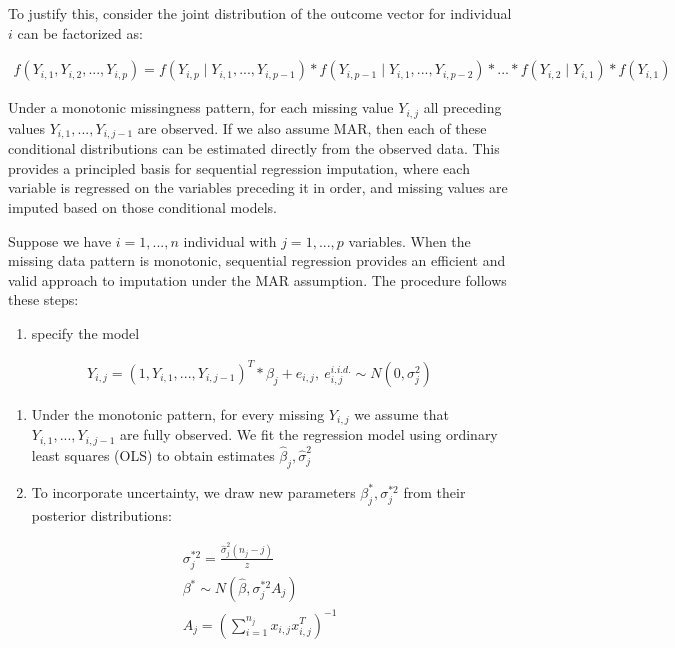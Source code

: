 \documentclass{article}
\providecommand{\tightlist}{%
  \setlength{\itemsep}{0pt}\setlength{\parskip}{0pt}}
\begin{document}
To justify this, consider the joint distribution of the outcome vector
for individual \(i\) can be factorized as:

\begin{align*}
    f(Y_{i,1},Y_{i,2},...,Y_{i,p}) = f(Y_{i,p} \mid Y_{i,1},...,Y_{i,p-1}) * 
    f(Y_{i,p-1} \mid Y_{i,1},...,Y_{i,p-2}) * ... * f(Y_{i,2} \mid Y_{i,1}) 
    * f(Y_{i,1})
    \end{align*}

Under a monotonic missingness pattern, for each missing value
\(Y_{i,j}\) all preceding values \(Y_{i,1},...,Y_{i,j-1}\) are observed.
If we also assume MAR, then each of these conditional distributions can
be estimated directly from the observed data. This provides a principled
basis for sequential regression imputation, where each variable is
regressed on the variables preceding it in order, and missing values are
imputed based on those conditional models.

Suppose we have \(i=1,...,n\) individual with \(j=1,...,p\) variables.
When the missing data pattern is monotonic, sequential regression
provides an efficient and valid approach to imputation under the MAR
assumption. The procedure follows these steps:

\begin{enumerate}
\def\labelenumi{\arabic{enumi}.}
\tightlist
\item
  specify the model
\end{enumerate}

\begin{align*}    
    Y_{i,j} = (1,Y_{i,1},...,Y_{i,j-1})^{T} * \beta_{j} + 
    e_{i,j},\ {e_{i,j}^{i.i.d.} \sim{N} (0,\sigma^{2}_{j})}
    \end{align*}

\begin{enumerate}
\def\labelenumi{\arabic{enumi}.}
\setcounter{enumi}{1}
\item
  Under the monotonic pattern, for every missing \(Y_{i,j}\) we assume
  that \(Y_{i,1},...,Y_{i,j-1}\) are fully observed. We fit the
  regression model using ordinary least squares (OLS) to obtain
  estimates \(\hat{\beta}_{j},\hat{\sigma}_{j}^{2}\)
\item
  To incorporate uncertainty, we draw new parameters
  \(\beta_{j}^{*},\sigma_{j}^{*2}\) from their posterior distributions:
\end{enumerate}

\begin{align*}
   \sigma_j^{*2} = \frac{\hat{\sigma}_j^2 (n_j - j)}{z} \\
   \beta^* \sim N(\hat{\beta}, \sigma_j^{*2} A_j) \\
   A_j = (\sum_{i=1}^{n_j} x_{i,j} x_{i,j}^T)^{-1}
   \end{align*}
\end{document}
